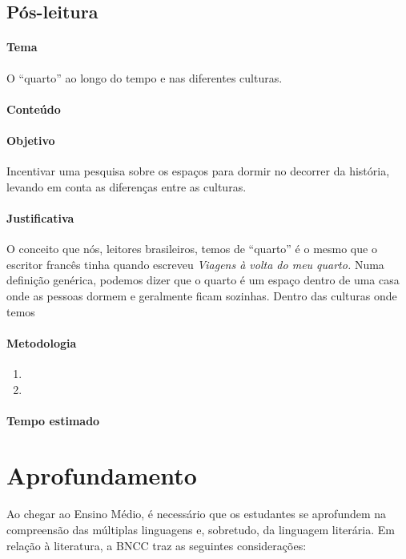 \documentclass[12pt]{extarticle}
\begin{document}
\subsection{Pós-leitura}


\paragraph{Tema} O ``quarto'' ao longo do tempo e nas diferentes culturas.

\paragraph{Conteúdo} 

\paragraph{Objetivo} Incentivar uma pesquisa sobre os espaços para dormir 
no decorrer da história, levando em conta as diferenças entre as culturas.

\paragraph{Justificativa} O conceito que nós, leitores brasileiros,
temos de ``quarto'' é o mesmo que o escritor francês tinha 
quando escreveu \emph{Viagens à volta do meu quarto.} Numa definição genérica,
podemos dizer que o quarto é um espaço dentro de uma casa onde as pessoas dormem
e geralmente ficam sozinhas. 
Dentro das culturas onde temos 

\paragraph{Metodologia}
\begin{enumerate}
	\item
	\item
\end{enumerate}

\paragraph{Tempo estimado}


\section{Aprofundamento}

Ao chegar ao Ensino Médio, é necessário que os estudantes se aprofundem
na compreensão das múltiplas linguagens e, sobretudo, da linguagem
literária. Em relação à literatura, a BNCC traz as seguintes
considerações:
\end{document}
